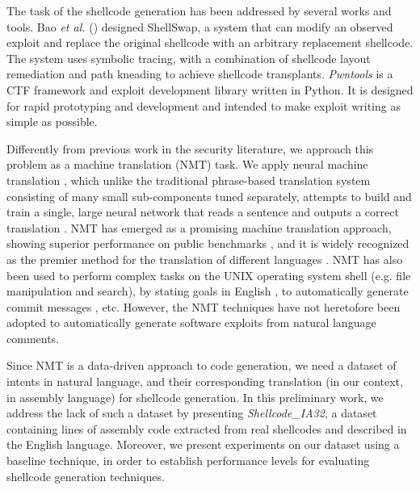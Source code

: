 \documentclass[11pt,a4paper]{article}
\newcommand{\datasetname}[1]{\emph{Shellcode\_IA32}}
\begin{document}
The task of the shellcode generation has been addressed by several works and tools. Bao \textit{et al.} (\citeyear{bao2017your}) designed ShellSwap, a system that can modify an observed exploit and replace the original shellcode with an arbitrary replacement shellcode. The system uses symbolic tracing, with a combination of shellcode layout remediation and path kneading to achieve shellcode transplants. 
\textit{Pwntools} \cite{pwntools} is a CTF framework and exploit development library written in Python. It is designed for rapid prototyping and development and intended to make exploit writing as simple as possible.


Differently from previous work in the security literature, we approach this problem as a machine translation (NMT) task. We apply neural machine translation \cite{goodfellow2016deep}, which unlike the traditional phrase-based translation system consisting of many small sub-components tuned separately, attempts to build and train a single, large neural network that reads a sentence and outputs a correct translation \cite{bahdanau2014neural}. NMT has emerged as a promising machine translation approach, showing superior performance on public benchmarks \cite{bojar2016findings}, and it is widely recognized as the premier method for the translation of different languages \cite{wu2016google}. 
NMT has also been used to perform complex tasks on the UNIX operating system shell \cite{lin2017program} (e.g. file manipulation and search), by stating goals in English \cite{lin-etal-2018-nl2bash}, to automatically generate commit messages \cite{liu2018neural}, etc. However, the NMT techniques have not heretofore been adopted to automatically generate software exploits from natural language comments. 


 

Since NMT is a data-driven approach to code generation, we need a dataset of intents in natural language, and their corresponding translation (in our context, in assembly language) for shellcode generation. 
In this preliminary work, we address the lack of such a dataset by presenting \datasetname{}, a dataset containing  lines of assembly code extracted from real shellcodes and described in the English language. Moreover, we present experiments on our dataset using a baseline technique, in order to establish performance levels for evaluating shellcode generation techniques. 
\end{document}
